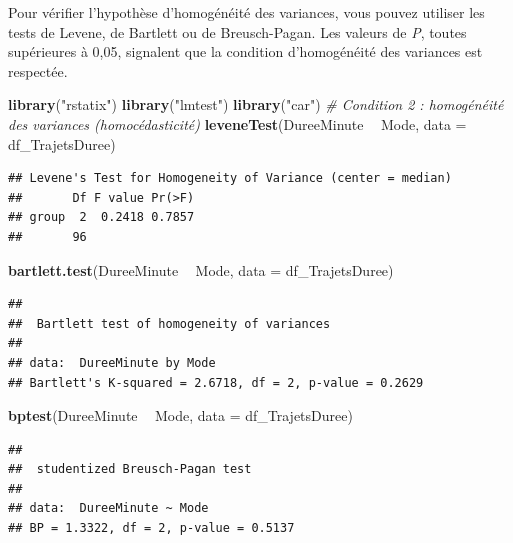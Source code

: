 \documentclass[
  11pt,
  french,
]{book}
\makeatletter
\newenvironment{Shaded}{\begin{snugshade}}{\end{snugshade}}
\newcommand{\CommentTok}[1]{\textcolor[rgb]{0.56,0.35,0.01}{\textit{#1}}}
\newcommand{\DataTypeTok}[1]{\textcolor[rgb]{0.13,0.29,0.53}{#1}}
\newcommand{\KeywordTok}[1]{\textcolor[rgb]{0.13,0.29,0.53}{\textbf{#1}}}
\newcommand{\NormalTok}[1]{#1}
\newcommand{\OperatorTok}[1]{\textcolor[rgb]{0.81,0.36,0.00}{\textbf{#1}}}
\newcommand{\StringTok}[1]{\textcolor[rgb]{0.31,0.60,0.02}{#1}}
\newenvironment{kframe}{%
\medskip{}
\setlength{\fboxsep}{.8em}
 \def\at@end@of@kframe{}%
 \ifinner\ifhmode%
  \def\at@end@of@kframe{\end{minipage}}%
  \begin{minipage}{\columnwidth}%
 \fi\fi%
 \def\FrameCommand##1{\hskip\@totalleftmargin \hskip-\fboxsep
 \colorbox{shadecolor}{##1}\hskip-\fboxsep
     \hskip-\linewidth \hskip-\@totalleftmargin \hskip\columnwidth}%
 \MakeFramed {\advance\hsize-\width
   \@totalleftmargin\z@ \linewidth\hsize
   \@setminipage}}%
 {\par\unskip\endMakeFramed%
 \at@end@of@kframe}
\renewenvironment{Shaded}{\begin{kframe}}{\end{kframe}}
\makeatother
\begin{document}
Pour vérifier l'hypothèse d'homogénéité des variances, vous pouvez utiliser les tests de Levene, de Bartlett ou de Breusch-Pagan. Les valeurs de \emph{P}, toutes supérieures à 0,05, signalent que la condition d'homogénéité des variances est respectée.

\begin{Shaded}
\begin{Highlighting}[]
\KeywordTok{library}\NormalTok{(}\StringTok{"rstatix"}\NormalTok{)}
\KeywordTok{library}\NormalTok{(}\StringTok{"lmtest"}\NormalTok{)}
\KeywordTok{library}\NormalTok{(}\StringTok{"car"}\NormalTok{)}
\CommentTok{# Condition 2 : homogénéité des variances (homocédasticité)}
\KeywordTok{leveneTest}\NormalTok{(DureeMinute }\OperatorTok{~}\StringTok{ }\NormalTok{Mode, }\DataTypeTok{data =}\NormalTok{ df_TrajetsDuree)}
\end{Highlighting}
\end{Shaded}

\begin{verbatim}
## Levene's Test for Homogeneity of Variance (center = median)
##       Df F value Pr(>F)
## group  2  0.2418 0.7857
##       96
\end{verbatim}

\begin{Shaded}
\begin{Highlighting}[]
\KeywordTok{bartlett.test}\NormalTok{(DureeMinute }\OperatorTok{~}\StringTok{ }\NormalTok{Mode, }\DataTypeTok{data =}\NormalTok{ df_TrajetsDuree)}
\end{Highlighting}
\end{Shaded}

\begin{verbatim}
## 
## 	Bartlett test of homogeneity of variances
## 
## data:  DureeMinute by Mode
## Bartlett's K-squared = 2.6718, df = 2, p-value = 0.2629
\end{verbatim}

\begin{Shaded}
\begin{Highlighting}[]
\KeywordTok{bptest}\NormalTok{(DureeMinute }\OperatorTok{~}\StringTok{ }\NormalTok{Mode, }\DataTypeTok{data =}\NormalTok{ df_TrajetsDuree)}
\end{Highlighting}
\end{Shaded}

\begin{verbatim}
## 
## 	studentized Breusch-Pagan test
## 
## data:  DureeMinute ~ Mode
## BP = 1.3322, df = 2, p-value = 0.5137
\end{verbatim}
\end{document}

